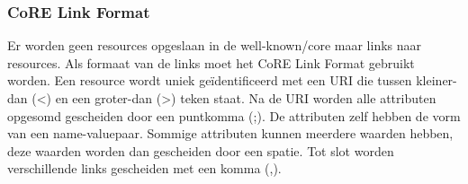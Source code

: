 \subsubsection{CoRE Link Format}
Er worden geen resources opgeslaan in de well-known/core maar links naar resources. Als formaat van de links moet het CoRE Link Format gebruikt worden. Een resource wordt uniek ge\"{i}dentificeerd met een URI die tussen kleiner-dan (\textless) en een groter-dan (\textgreater) teken staat. Na de URI worden alle attributen opgesomd gescheiden door een puntkomma (;). De attributen zelf hebben de vorm van een name-valuepaar. Sommige attributen kunnen meerdere waarden hebben, deze waarden worden dan gescheiden door een spatie. Tot slot worden verschillende links gescheiden met een komma (,).\\


